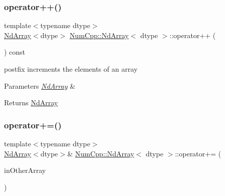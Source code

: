\subsubsection{\texorpdfstring{operator++()}{operator++()}\hspace{0.1cm}{\footnotesize\ttfamily [2/2]}}
{\footnotesize\ttfamily template$<$typename dtype$>$ \\
\mbox{\hyperlink{class_num_cpp_1_1_nd_array}{Nd\+Array}}$<$dtype$>$ \mbox{\hyperlink{class_num_cpp_1_1_nd_array}{Num\+Cpp\+::\+Nd\+Array}}$<$ dtype $>$\+::operator++ (\begin{DoxyParamCaption}\item[{int}]{ }\end{DoxyParamCaption}) const\hspace{0.3cm}{\ttfamily [inline]}}

postfix increments the elements of an array


\begin{DoxyParams}{Parameters}
{\em \mbox{\hyperlink{class_num_cpp_1_1_nd_array}{Nd\+Array}}} & \\
\hline
\end{DoxyParams}
\begin{DoxyReturn}{Returns}
\mbox{\hyperlink{class_num_cpp_1_1_nd_array}{Nd\+Array}} 
\end{DoxyReturn}
\mbox{\label{class_num_cpp_1_1_nd_array_ade15ba24ad3bc5474c5f53681a6fd3fe}} 
\subsubsection{\texorpdfstring{operator+=()}{operator+=()}\hspace{0.1cm}{\footnotesize\ttfamily [1/2]}}
{\footnotesize\ttfamily template$<$typename dtype$>$ \\
\mbox{\hyperlink{class_num_cpp_1_1_nd_array}{Nd\+Array}}$<$dtype$>$\& \mbox{\hyperlink{class_num_cpp_1_1_nd_array}{Num\+Cpp\+::\+Nd\+Array}}$<$ dtype $>$\+::operator+= (\begin{DoxyParamCaption}\item[{const \mbox{\hyperlink{class_num_cpp_1_1_nd_array}{Nd\+Array}}$<$ dtype $>$ \&}]{in\+Other\+Array }\end{DoxyParamCaption})\hspace{0.3cm}{\ttfamily [inline]}}

